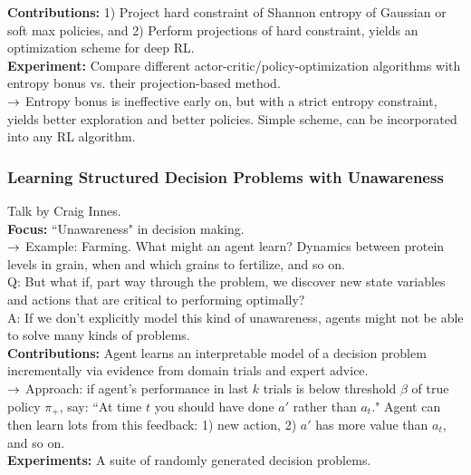 {\bf Contributions:} 1) Project hard constraint of Shannon entropy of Gaussian or soft max policies, and 2) Perform projections of hard constraint, yields an optimization scheme for deep RL. \\

{\bf Experiment:} Compare different actor-critic/policy-optimization algorithms with entropy bonus vs. their projection-based method. \\
$\rightarrow$ Entropy bonus is ineffective early on, but with a strict entropy constraint, yields better exploration and better policies. Simple scheme, can be incorporated into any RL algorithm. \\

\spacerule

\subsubsection{Learning Structured Decision Problems with Unawareness~\cite{innes2019learning}}

Talk by Craig Innes. \\

{\bf Focus:} ``Unawareness" in decision making.\\

$\rightarrow$ Example: Farming. What might an agent learn? Dynamics between protein levels in grain, when and which grains to fertilize, and so on. \\

Q: But what if, part way through the problem, we discover new state variables and actions that are critical to performing optimally? \\

A: If we don't explicitly model this kind of unawareness, agents might not be able to solve many kinds of problems. \\

{\bf Contributions:} Agent learns an interpretable model of a decision problem incrementally via evidence from domain trials and expert advice.\\

$\rightarrow$ Approach: if agent's performance in last $k$ trials is below threshold $\beta$ of true policy $\pi_+$, say: ``At time $t$ you should have done $a'$ rather than $a_t$." Agent can then learn lots from this feedback: 1) new action, 2) $a'$ has more value than $a_t$, and so on. \\

{\bf Experiments:} A suite of randomly generated decision problems. \\

